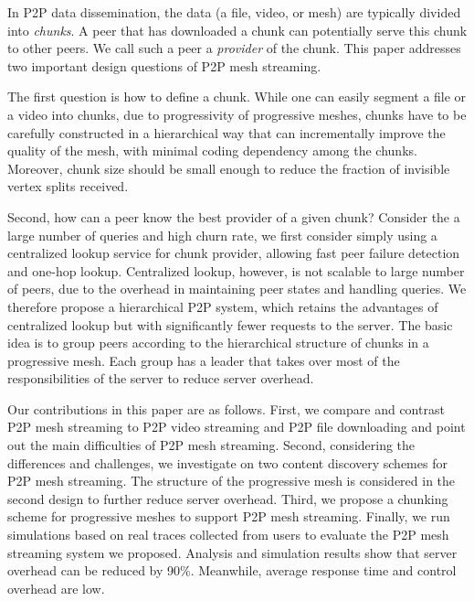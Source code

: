     In P2P data dissemination, the data (a file, video, or
    mesh) are typically divided into \textit{chunks}.  A
    peer that has downloaded a chunk can potentially serve
    this chunk to other peers.  We call such a peer a
    \textit{provider} of the chunk.  This paper addresses
    two important design questions of P2P mesh streaming.

    The first question is how to define a chunk.  While one 
    can easily segment a 
    file or a video into chunks, due to progressivity
    of progressive meshes, chunks have to be carefully 
    constructed in a hierarchical way that can
    incrementally improve the quality of the mesh, with
    minimal coding dependency among the chunks.
    Moreover, chunk size should be small enough to 
    reduce the fraction of invisible vertex splits
    received. 

    Second, how can
    a peer know the best provider of a given chunk?   
    Consider the a large number of queries and high churn
    rate, we first consider simply using a 
    centralized lookup service for chunk provider,
    allowing fast peer failure detection and one-hop lookup.
    Centralized lookup, however, is not scalable to large
    number of peers, due to the overhead in maintaining
    peer states and handling queries.
    We therefore propose a hierarchical P2P
    system, which retains the advantages of centralized
    lookup but with significantly fewer 
    requests to the server.  The
    basic idea is to group peers according to the
    hierarchical structure of chunks in a progressive mesh.
    Each group has a leader that takes over most of the responsibilities of the server to
    reduce server overhead.
    
    Our contributions in this paper are as follows.
    First, we compare and contrast P2P mesh streaming to P2P
    video streaming and P2P file downloading and point out
    the main difficulties of P2P mesh streaming.  Second, 
    considering the differences and challenges, 
    we investigate on two content discovery schemes for P2P
    mesh streaming.  The structure of the progressive
    mesh is considered in the second design to further
    reduce server overhead.  Third, we propose a 
    chunking scheme for progressive meshes to support P2P mesh
    streaming.  Finally, we run simulations based on real
    traces collected from users to evaluate the P2P
    mesh streaming system we proposed.  Analysis and
    simulation results show that server overhead can be
    reduced by 90\%. Meanwhile,  average response time and
    control overhead are low.


